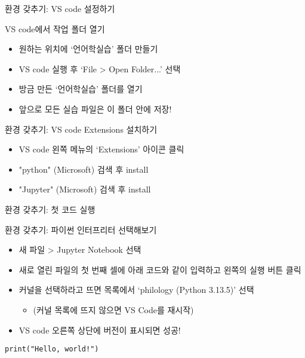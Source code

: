 \documentclass[11pt, aspectratio=169]{beamer}
\begin{document}
\begin{frame}[t]{환경 갖추기: VS code 설정하기}

  \begin{block}{VS code에서 작업 폴더 열기}
    \begin{itemize}
      \item 원하는 위치에 `언어학실습' 폴더 만들기
      \item VS code 실행 후 `File > Open Folder...' 선택
      \item 방금 만든 `언어학실습' 폴더를 열기
      \item 앞으로 모든 실습 파일은 이 폴더 안에 저장!
    \end{itemize}
  \end{block}

  \begin{block}{환경 갖추기: VS code Extensions 설치하기}
    \begin{itemize}
      \item VS code 왼쪽 메뉴의 `Extensions' 아이콘 클릭
      \item "python" (Microsoft) 검색 후 install
      \item "Jupyter" (Microsoft) 검색 후 install
    \end{itemize}    
  \end{block}
\end{frame}

\begin{frame}[t, fragile]{환경 갖추기: 첫 코드 실행}
  \begin{block}{환경 갖추기: 파이썬 인터프리터 선택해보기}
    \begin{itemize}
      \item 새 파일 > Jupyter Notebook 선택
      \item 새로 열린 파일의 첫 번째 셀에 아래 코드와 같이 입력하고 왼쪽의 실행 버튼 클릭
      \item 커널을 선택하라고 뜨면 목록에서 `philology (Python 3.13.5)' 선택
        \begin{itemize}
          \item (커널 목록에 뜨지 않으면 VS Code를 재시작)
        \end{itemize}
      \item VS code 오른쪽 상단에 버전이 표시되면 성공!
    \end{itemize}
  \end{block}
  \begin{verbatim}
print("Hello, world!")
  \end{verbatim}    
\end{frame}
\end{document}
